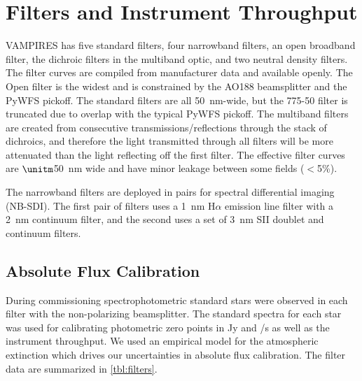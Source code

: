 \section{Filters and Instrument Throughput}\label{sec:filters}

VAMPIRES has five standard filters, four narrowband filters, an open broadband filter, the dichroic filters in the multiband optic, and two neutral density filters. The filter curves are compiled from manufacturer data and available openly. The Open filter is the widest and is constrained by the AO188 beamsplitter and the PyWFS pickoff. The standard filters are all \qty{50}{\nm}-wide, but the 775-50 filter is truncated due to overlap with the typical PyWFS pickoff. The multiband filters are created from consecutive transmissions/reflections through the stack of dichroics, and therefore the light transmitted through all filters will be more attenuated than the light reflecting off the first filter. The effective filter curves are $\unitm$\qty{50}{\nm} wide and have minor leakage between some fields ($<$5\%).

The narrowband filters are deployed in pairs for spectral differential imaging (NB-SDI). The first pair of filters uses a \qty{1}{\nm} H$\alpha$ emission line filter with a \qty{2}{\nm} continuum filter, and the second uses a set of \qty{3}{\nm} SII doublet and continuum filters.

\subsection{Absolute Flux Calibration}

During commissioning spectrophotometric standard stars were observed in each filter with the non-polarizing beamsplitter. The standard spectra for each star was used for calibrating photometric zero points in \unit{Jy} and \unit{\electron/\second} as well as the instrument throughput. We used an empirical model for the atmospheric extinction \citep{buton_atmospheric_2013} which drives our uncertainties in absolute flux calibration. The filter data are summarized in \autoref{tbl:filters}.

